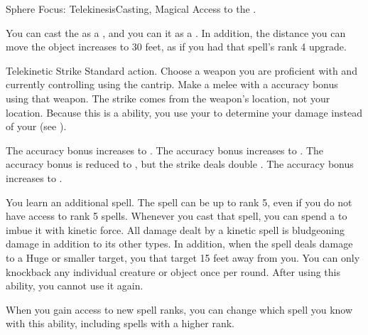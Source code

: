     \begin{magicalfeat}{Sphere Focus: Telekinesis}{Casting, Magical}
        \featpre Access to the  .

         You can cast the   as a , and you can  it as a .
        In addition, the distance you can move the object increases to 30 feet, as if you had that spell's rank 4 upgrade.

        \begin{magicalactiveability}{Telekinetic Strike}
            \abilityusagetime Standard action.
            \rankline
            Choose a weapon you are proficient with and currently controlling using the  cantrip.
            Make a melee  with a  accuracy bonus using that weapon.
            The strike comes from the weapon's location, not your location.
            Because this is a \magical ability, you use your  to determine your damage instead of your  (see ).

            \rankline
             The accuracy bonus increases to .
             The accuracy bonus increases to .
             The accuracy bonus is reduced to , but the strike deals double .
             The accuracy bonus increases to .
        \end{magicalactiveability}

         You learn an additional spell.
        The spell can be up to rank 5, even if you do not have access to rank 5 spells.
        Whenever you cast that spell, you can spend a  to  imbue it with kinetic force.
        All damage dealt by a kinetic spell is bludgeoning damage in addition to its other types.
        In addition, when the spell deals damage to a Huge or smaller target, you  that target 15 feet away from you.
        You can only knockback any individual creature or object once per round.
        After using this ability, you  cannot use it again.

        When you gain access to new spell ranks, you can change which spell you know with this ability, including spells with a higher rank.


\end{magicalfeat}
